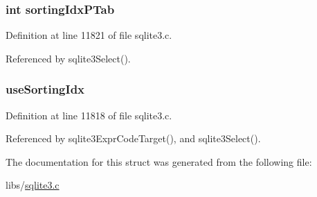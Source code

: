 \subsubsection[{sorting\+Idx\+P\+Tab}]{\setlength{\rightskip}{0pt plus 5cm}int sorting\+Idx\+P\+Tab}\label{struct_agg_info_a7bfac432926e3f589e8527c7f7d9bff1}


Definition at line 11821 of file sqlite3.\+c.



Referenced by sqlite3\+Select().

\hypertarget{struct_agg_info_a391d05aacd406e0a61ac222d31d41634}{}
\subsubsection[{use\+Sorting\+Idx}]{ use\+Sorting\+Idx}\label{struct_agg_info_a391d05aacd406e0a61ac222d31d41634}


Definition at line 11818 of file sqlite3.\+c.



Referenced by sqlite3\+Expr\+Code\+Target(), and sqlite3\+Select().



The documentation for this struct was generated from the following file\+:\begin{DoxyCompactItemize}
\item 
libs/\hyperlink{sqlite3_8c}{sqlite3.\+c}\end{DoxyCompactItemize}

